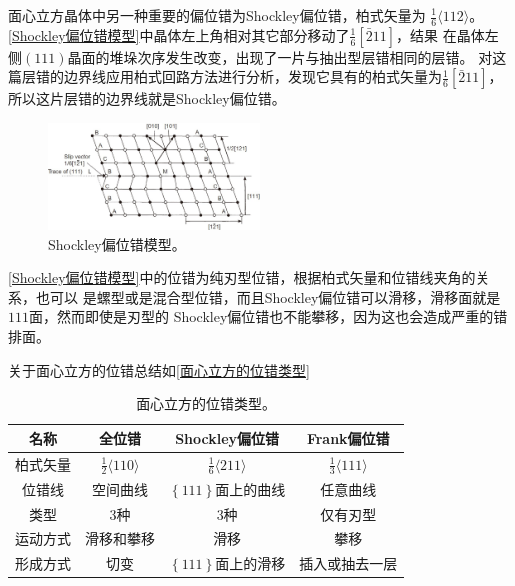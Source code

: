                 面心立方晶体中另一种重要的偏位错为Shockley偏位错，柏式矢量为 $\frac{1}{6}\langle 112 \rangle$。
                \autoref{Shockley偏位错模型}中晶体左上角相对其它部分移动了$\frac{1}{6}[\bar{2}11]$，结果
                在晶体左侧$(111)$晶面的堆垛次序发生改变，出现了一片与抽出型层错相同的层错。
                对这篇层错的边界线应用柏式回路方法进行分析，发现它具有的柏式矢量为$\frac{1}{6}[\bar{2}11]$，
                所以这片层错的边界线就是Shockley偏位错。
                \begin{figure}[ht]
                    \centering
                    \includegraphics[width=0.5\textwidth]{fig/Formation_of_a_Shockley_partial_dislocation.jpg}
                    \caption{Shockley偏位错模型。}
                    \label{Shockley偏位错模型}
                \end{figure}
                
                \autoref{Shockley偏位错模型}中的位错为纯刃型位错，根据柏式矢量和位错线夹角的关系，也可以
                是螺型或是混合型位错，而且Shockley偏位错可以滑移，滑移面就是${111}$面，然而即使是刃型的
                Shockley偏位错也不能攀移，因为这也会造成严重的错排面。

                关于面心立方的位错总结如\autoref{面心立方的位错类型}
                \begin{table}[ht]
                    \begin{center}
                        \caption{面心立方的位错类型。}
                        \label{面心立方的位错类型}
                        \begin{tabular}{cccc}
                            \toprule
                            名称&全位错&Shockley偏位错&Frank偏位错 \\
                            \midrule
                            柏式矢量& $\frac{1}{2}\langle 110 \rangle$& $\frac{1}{6}\langle 211 \rangle$& $\frac{1}{3}\langle 111 \rangle$ \\
                            位错线&空间曲线&$\left\{ 111\right\}面上的曲线$&任意曲线\\
                            类型&3种&3种&仅有刃型\\
                            运动方式&滑移和攀移&滑移&攀移\\
                            形成方式&切变&$\left\{ 111\right\}$面上的滑移&插入或抽去一层\\
                            \bottomrule
                        \end{tabular}
                    \end{center}
                \end{table}

